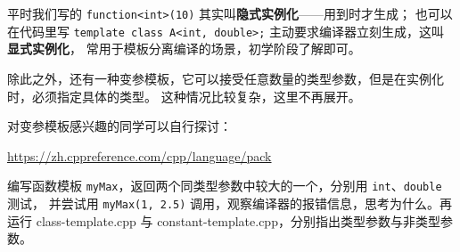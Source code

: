 平时我们写的 \texttt{function<int>(10)} 其实叫\textbf{隐式实例化}——用到时才生成；
也可以在代码里写 \texttt{template class A<int, double>;} 主动要求编译器立刻生成，这叫\textbf{显式实例化}，
常用于模板分离编译的场景，初学阶段了解即可。

除此之外，还有一种变参模板，它可以接受任意数量的类型参数，但是在实例化时，必须指定具体的类型。
这种情况比较复杂，这里不再展开。

\begin{note}
对变参模板感兴趣的同学可以自行探讨：

\url{https://zh.cppreference.com/cpp/language/pack}
\end{note}

\begin{exercise}\label{ex:v1-cpp-template}

编写函数模板 \texttt{myMax}，返回两个同类型参数中较大的一个，分别用 \texttt{int}、\texttt{double} 测试，
并尝试用 \texttt{myMax(1, 2.5)} 调用，观察编译器的报错信息，思考为什么。再运行 class-template.cpp 与 constant-template.cpp，分别指出类型参数与非类型参数。
\end{exercise}
